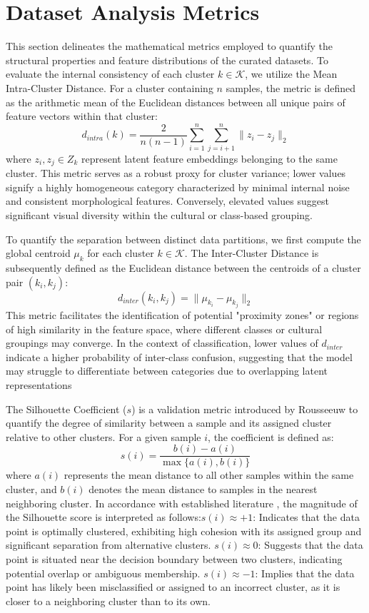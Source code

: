 \section{Dataset Analysis Metrics}
\label{ch2:sec:metrics}
This section delineates the mathematical metrics employed to quantify the structural properties and feature distributions of the curated datasets.
To evaluate the internal consistency of each cluster $k \in \mathcal{K}$, we utilize the Mean Intra-Cluster Distance. 
For a cluster containing $n$ samples, the metric is defined as the arithmetic mean of the Euclidean distances between all unique pairs of feature vectors within that cluster:$$ d_{intra}(k) = \frac{2}{n(n-1)} \sum_{i=1}^{n} \sum_{j=i+1}^{n} \| z_i - z_j \|_2 $$where $z_i, z_j \in Z_k$ represent latent feature embeddings belonging to the same cluster. This metric serves as a robust proxy for cluster variance; lower values signify a highly homogeneous category characterized by minimal internal noise and consistent morphological features. 
Conversely, elevated values suggest significant visual diversity within the cultural or class-based grouping.

To quantify the separation between distinct data partitions, we first compute the global centroid $\mu_{k}$ for each cluster $k \in \mathcal{K}$. 
The Inter-Cluster Distance is subsequently defined as the Euclidean distance between the centroids of a cluster pair $(k_i, k_j)$:$$ d_{inter}(k_i, k_j) = \| \mu_{k_i} - \mu_{k_j} \|_2 $$
This metric facilitates the identification of potential "proximity zones" or regions of high similarity in the feature space, where different classes or cultural groupings may converge. 
In the context of classification, lower values of $d_{inter}$ indicate a higher probability of inter-class confusion, suggesting that the model may struggle to differentiate between categories due to overlapping latent representations


The Silhouette Coefficient ($s$) is a validation metric introduced by Rousseeuw \citep{rousseeuw1987silhouettes} to quantify the degree of similarity between a sample and its assigned cluster relative to other clusters. For a given sample $i$, the coefficient is defined as:$$ s(i) = \frac{b(i) - a(i)}{\max\{a(i), b(i)\}} $$where $a(i)$ represents the mean distance to all other samples within the same cluster, and $b(i)$ denotes the mean distance to samples in the nearest neighboring cluster. 
In accordance with established literature \citep{9260048}, the magnitude of the Silhouette score is interpreted as follows:$s(i) \approx +1$: Indicates that the data point is optimally clustered, exhibiting high cohesion with its assigned group and significant separation from alternative clusters.
$s(i) \approx 0$: Suggests that the data point is situated near the decision boundary between two clusters, indicating potential overlap or ambiguous membership.
$s(i) \approx -1$: Implies that the data point has likely been misclassified or assigned to an incorrect cluster, as it is closer to a neighboring cluster than to its own.

